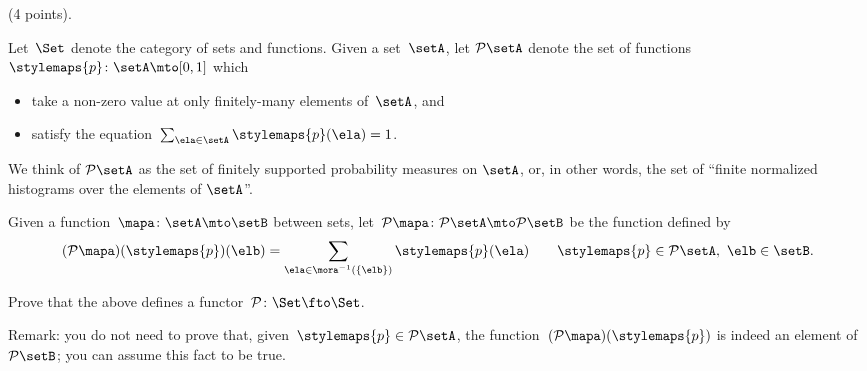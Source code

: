 \documentclass[paper=8.125in:10.250in,pagesize=pdftex,
    headinclude=false,footinclude=false,oneside,egregdoesnotlikesansseriftitles]{kaobook}
\begin{document}

\newpage


\begin{gradedexercise}\label{ex:ProbFunc} (4 points).


Let~$\Set$ denote the category of sets and functions.
Given a set~$\setA$, let $\mathcal{P} \setA$ denote the set of functions~$\stylemaps{p}\colon \setA \mto [0,1]$ which
\begin{itemize}
\item take a non-zero value at only finitely-many elements of~$\setA$, and
\item satisfy the equation~$\sum_{\ela \in \setA} \stylemaps{p}(\ela) = 1$.
\end{itemize}
We think of $\mathcal{P} \setA$ as the set of finitely supported probability measures on $\setA$, or, in other words, the set of ``finite normalized histograms over the elements of $\setA$''.

Given a function~$\mapa\colon \setA \mto \setB$ between sets, let~$\mathcal{P} \mapa\colon \mathcal{P}\setA \mto \mathcal{P}\setB$ be the function defined by
\begin{equation*}
(\mathcal{P} \mapa)(\stylemaps{p})(\elb) = \sum_{\ela \in \mora^{-1}(\{ \elb \})} \stylemaps{p}(\ela) \quad \quad  \stylemaps{p} \in \mathcal{P}\setA, \  \elb \in \setB.
\end{equation*}

Prove that the above defines a functor~$\mathcal{P}\colon \Set \fto \Set$.

Remark: you do not need to prove that, given~$\stylemaps{p} \in \mathcal{P}\setA$, the function~$(\mathcal{P} \mapa)(\stylemaps{p})$ is indeed an element of~$\mathcal{P}\setB$; you can assume this fact to be true.
\end{gradedexercise}


\newpage
\end{document}
